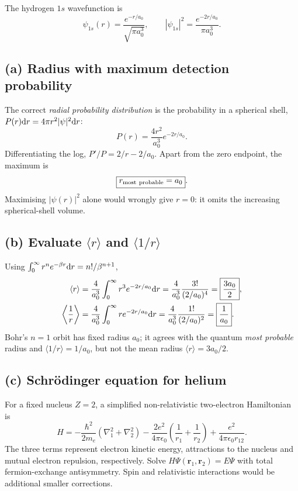 
The hydrogen \(1s\) wavefunction is
\[
\psi_{1s}(r)=\frac{e^{-r/a_0}}{\sqrt{\pi a_0^3}},
\qquad
|\psi_{1s}|^2=\frac{e^{-2r/a_0}}{\pi a_0^3}.
\]

\subsection*{(a) Radius with maximum detection probability}
The correct \emph{radial probability distribution}
is the probability in a spherical shell,
\(P(r)\mathrm{d} r=4\pi r^2|\psi|^2\mathrm{d} r\):
\[
P(r)=\frac{4r^2}{a_0^3}e^{-2r/a_0}.
\]
Differentiating the log,
\(P'/P=2/r-2/a_0\). Apart from the zero
endpoint, the maximum is
\[
\boxed{r_{\rm most\ probable}=a_0}.
\]
Maximising \(|\psi(r)|^2\) alone would wrongly give
\(r=0\): it omits the increasing spherical-shell volume.

\subsection*{(b) Evaluate \(\langle r\rangle\) and
\(\langle1/r\rangle\)}
Using
\(\int_0^\infty r^n e^{-\beta r}\mathrm{d} r
=n!/\beta^{n+1}\),
\begin{align*}
\langle r\rangle
&=\frac4{a_0^3}\int_0^\infty
r^3e^{-2r/a_0}\mathrm{d} r
=\frac4{a_0^3}\frac{3!}{(2/a_0)^4}
=\boxed{\frac{3a_0}{2}},\\
\left\langle\frac1r\right\rangle
&=\frac4{a_0^3}\int_0^\infty
re^{-2r/a_0}\mathrm{d} r
=\frac4{a_0^3}\frac{1!}{(2/a_0)^2}
=\boxed{\frac1{a_0}}.
\end{align*}
Bohr's \(n=1\) orbit has fixed radius \(a_0\);
it agrees with the quantum \emph{most probable}
radius and \(\langle1/r\rangle=1/a_0\),
but not the mean radius \(\langle r\rangle=3a_0/2\).

\subsection*{(c) Schr\"odinger equation for helium}
For a fixed nucleus \(Z=2\), a simplified
non-relativistic two-electron Hamiltonian is
\[
\boxed{H=
-\frac{\hbar^2}{2m_e}(\nabla_1^2+\nabla_2^2)
-\frac{2e^2}{4\pi\epsilon_0}
\left(\frac1{r_1}+\frac1{r_2}\right)
+\frac{e^2}{4\pi\epsilon_0r_{12}}.}
\]
The three terms represent electron kinetic
energy, attractions to the nucleus and mutual
electron repulsion, respectively. Solve
\(H\Psi(\mathbf r_1,\mathbf r_2)=E\Psi\)
with total fermion-exchange antisymmetry.
Spin and relativistic interactions would be
additional smaller corrections.

